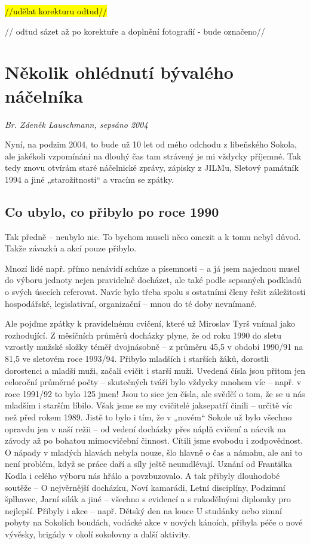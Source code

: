 \hl{//udělat korekturu odtud//}

// odtud sázet až po korektuře a doplnění fotografií - bude označeno//

\section{Několik ohlédnutí bývalého
náčelníka}\label{nux11bkolik-ohluxe9dnutuxed-buxfdvaluxe9ho-nuxe1ux10delnuxedka}

\emph{Br. Zdeněk Lauschmann, sepsáno 2004}

Nyní, na podzim 2004, to bude už 10 let od mého odchodu z libeňského
Sokola, ale jakékoli vzpomínání na dlouhý čas tam strávený je mi vždycky
příjemné. Tak tedy znovu otvírám staré náčelnické zprávy, zápisky z
JILMu, Sletový památník 1994 a jiné „starožitnosti`` a vracím se zpátky.

\subsection{Co ubylo, co přibylo po roce
1990}\label{co-ubylo-co-pux159ibylo-po-roce-1990}

Tak předně -- neubylo nic. To bychom museli něco omezit a k tomu nebyl
důvod. Takže závazků a akcí pouze přibylo.

Mnozí lidé např. přímo nenávidí schůze a písemnosti -- a já jsem
najednou musel do výboru jednoty nejen pravidelně docházet, ale také
podle sepsaných podkladů o svých úsecích referovat. Navíc bylo třeba
spolu s ostatními členy řešit záležitosti hospodářské, legislativní,
organizační -- mnou do té doby nevnímané.

Ale pojďme zpátky k pravidelnému cvičení, které už Miroslav Tyrš vnímal
jako rozhodující. Z měsíčních průměrů docházky plyne, že od roku 1990 do
sletu vzrostly mužské složky téměř dvojnásobně -- z průměru 45,5 v
období 1990/91 na 81,5 ve sletovém roce 1993/94. Přibylo mladších i
starších žáků, dorostli dorostenci a mladší muži, začali cvičit i starší
muži. Uvedená čísla jsou přitom jen celoroční průměrné počty --
skutečných tváří bylo vždycky mnohem víc -- např. v roce 1991/92 to bylo
125 jmen! Jsou to sice jen čísla, ale svědčí o tom, že se u nás mladším
i starším líbilo. Však jsme se my cvičitelé jaksepatří činili -- určitě
víc než před rokem 1989. Jistě to bylo i tím, že v „novém`` Sokole už
bylo všechno opravdu jen v naší režii -- od vedení docházky přes náplň
cvičení a nácvik na závody až po bohatou mimocvičební činnost. Cítili
jsme svobodu i zodpovědnost. O nápady v mladých hlavách nebyla nouze,
šlo hlavně o čas a námahu, ale ani to není problém, když se práce daří a
síly ještě neumdlévají. Uznání od Františka Kodla i celého výboru nás
hřálo a povzbuzovalo. A tak přibyly dlouhodobé soutěže -- O nejvěrnější
docházku, Noví kamarádi, Letní disciplíny, Podzimní šplhavec, Jarní
silák a jiné -- všechno s evidencí a s rukodělnými diplomky pro
nejlepší. Přibyly i akce -- např. Dětský den na louce U studánky nebo
zimní pobyty na Sokolích boudách, vodácké akce v nových kánoích, přibyla
péče o nové vývěsky, brigády v okolí sokolovny a další aktivity.

